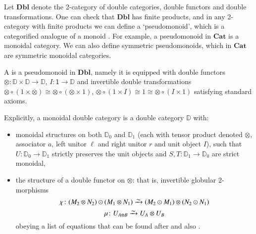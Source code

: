 \documentclass[a4paper,onecolumn, superscriptaddress,10pt, accepted=2022-03-25, issue=SS, volume=VV, shorttitle=papers/compositionality-VV-SS]{compositionalityarticle}
\newcommand{\simrightarrow}{\xrightarrow{\raisebox{-3pt}[0pt][0pt]{\ensuremath{\sim}}}}
\let\maps\colon
\newcommand{\one}{\mathsf{1}}
\newcommand{\bicat}{\mathbf}
\newcommand{\Dbl}{\bicat{Dbl}}
\newcommand{\Cat}{\bicat{Cat}}
\newcommand{\double}[1]{\mathbf{\mathbb #1}}
\newcommand{\lD}{\double{D}}
\newcommand{\define}[1]{{\bf \boldmath{#1}}}
\begin{document}
Let $\Dbl$ denote the 2-category of double categories, double functors and double transformations. One can check that $\Dbl$ has finite products, and in any 2-category with finite products we can define a `pseudomonoid', which is a categorified analogue of a monoid \cite{DS}. For example, a pseudomonoid in $\Cat$ is a monoidal category.   We can also define symmetric pseudomonoids, which in $\Cat$ are symmetric monoidal categories.

\begin{defn}
\label{defn:monoidal_double_category}
A \define{monoidal double category} is a pseudomonoid in $\Dbl$, namely it is equipped with double functors $\otimes\maps\lD\times\lD\to\lD$, $I\maps\one\to\lD$ and invertible double transformations $\otimes\circ(1\times\otimes)\cong\otimes\circ(\otimes\times1)$, $\otimes\circ(1\times I)\cong1\cong\otimes\circ(I\times1)$ satisfying standard axioms.
\end{defn} 
\noindent
Explicitly, a monoidal double category is a double category $\lD$ with:
\begin{itemize}
\item monoidal structures on both $\lD_0$ and $\lD_1$ (each with tensor product denoted $\otimes$, associator $a$, left unitor $\ell$ and right unitor $r$ and unit object $I$), such that $U \maps \lD_0 \to \lD_1$ strictly preserves the unit objects and $S,T \maps \lD_1 \to \lD_0$ are strict monoidal,    
\item the structure of a double functor on $\otimes$:
that is, invertible globular 2-morphisms
\[ \chi \maps (M_2\otimes N_2)\odot(M_1\otimes N_1)  \simrightarrow
(M_2\odot M_1)\otimes (N_2\odot N_1)\]
\[ \mu \maps U_{A\otimes B} \simrightarrow U_A \otimes U_B\]
obeying a list of equations that can be found after \cite[Definition 2.10]{HS} and also \cite[Definition A.5]{BC}.
\end{itemize}
\end{document}
